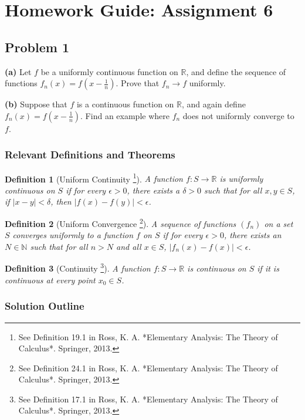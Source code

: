 \documentclass{article}
\newtheorem*{definition}{Definition}
\newcommand{\R}{\mathbb{R}}
\newcommand{\N}{\mathbb{N}}
\newcommand{\abs}[1]{\left|#1\right|}
\begin{document}
\section*{Homework Guide: Assignment 6}

\subsection*{Problem 1}

\textbf{(a)} Let \(f\) be a uniformly continuous function on \(\R\), and define the sequence of functions \(f_n(x) = f(x-\tfrac{1}{n})\). Prove that \(f_n \to f\) uniformly.

\textbf{(b)} Suppose that \(f\) is a continuous function on \(\R\), and again define \(f_n(x)=f(x-\tfrac{1}{n})\). Find an example where \(f_n\) does not uniformly converge to \(f\).

\subsubsection*{Relevant Definitions and Theorems}

\begin{definition}[Uniform Continuity \footnote{See Definition 19.1 in Ross, K. A. *Elementary Analysis: The Theory of Calculus*. Springer, 2013.}]
A function \(f: S \to \R\) is uniformly continuous on \(S\) if for every \(\epsilon > 0\), there exists a \(\delta > 0\) such that for all \(x, y \in S\), if \(\abs{x - y} < \delta\), then \(\abs{f(x) - f(y)} < \epsilon\).
\end{definition}

\begin{definition}[Uniform Convergence \footnote{See Definition 24.1 in Ross, K. A. *Elementary Analysis: The Theory of Calculus*. Springer, 2013.}]
A sequence of functions \((f_n)\) on a set \(S\) converges uniformly to a function \(f\) on \(S\) if for every \(\epsilon > 0\), there exists an \(N \in \N\) such that for all \(n > N\) and all \(x \in S\), \(\abs{f_n(x) - f(x)} < \epsilon\).
\end{definition}

\begin{definition}[Continuity \footnote{See Definition 17.1 in Ross, K. A. *Elementary Analysis: The Theory of Calculus*. Springer, 2013.}]
A function \(f: S \to \R\) is continuous on \(S\) if it is continuous at every point \(x_0 \in S\).
\end{definition}

\subsubsection*{Solution Outline}
\end{document}
